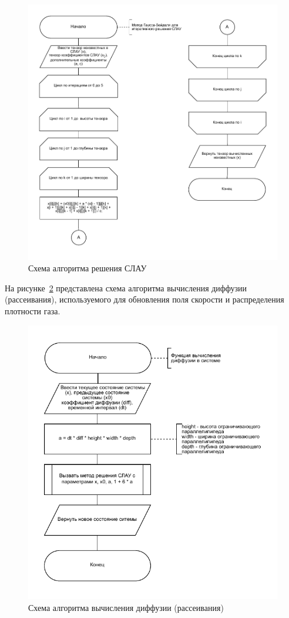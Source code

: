 \begin{figure}[H]
	\centering
	\includegraphics[width=1.0\textwidth,page=1]{assets/img/gauss-zeidel.pdf}
	\caption{Схема алгоритма решения СЛАУ}
	\label{fig:lin_solve}
\end{figure}

На рисунке~\ref{fig:diffuse} представлена схема алгоритма вычисления диффузии (рассеивания), используемого для обновления поля скорости и распределения плотности газа.

\begin{figure}[H]
	\centering
	\includegraphics[width=1.0\textwidth,page=1]{assets/img/diffuse.pdf}
	\caption{Схема алгоритма вычисления диффузии (рассеивания)}
	\label{fig:diffuse}
\end{figure}


